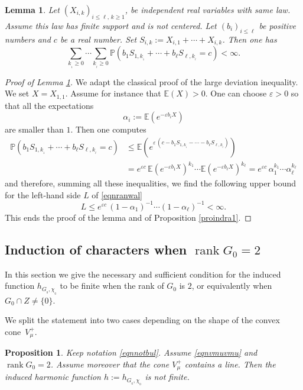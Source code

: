 \documentclass[11pt]{article}
\numberwithin{equation}{section}
\DeclareMathOperator{\rank}{rank}
\newtheorem{Prop}[Thm]{Proposition}
\newtheorem{Lem}[Thm]{Lemma}
\theoremstyle{definition}
\newcommand{\m}[1]{\mathbb{ #1}}
\let\al\alpha
\let\eps\varepsilon
\let\bq\relax
\let\eq\relax
\begin{document}
\begin{Lem}
\label{lemranwal}
Let $(X_{i,k})_{i\leq \ell,\, k\geq 1}$, be independent real variables
with same law. Assume this law has finite support and is not centered.
Let $(b_i)_{i\leq\ell}$ be positive numbers and $c$ be a real number.
Set $S_{i,k}:=X_{i,1}+\cdots+X_{i,k}$.
Then one has
\begin{equation}
\label{eqnranwal}
\sum_{k_{_1}\geq 0}\cdots\sum_{k_{_\ell}\geq 0}
\m P(b_1S_{1,k_{_1}}+\cdots +b_\ell S_{\ell,k_{_\ell}}=c)
<\infty.
\end{equation}
\end{Lem}

\begin{proof}[Proof of Lemma \ref{lemranwal}]
We adapt the classical proof of the large deviation inequality.
We set $X=X_{1,1}$. Assume for instance that $\m E (X)>0$.
One can choose $\eps>0$ so that all the expectations
\[
\al_i:=\m E(e^{-\eps b_i X})
\]
are smaller than $1$. Then one computes
\begin{align*}
\m P(b_1S_{1,k_{_1}}+\cdots +b_\ell S_{\ell,k_{_\ell}}=c)
&\leq
\m E(e^{\eps\,(c -b_1S_{1,k_{_1}}-\cdots -b_\ell S_{\ell,k_{_\ell}})})\\
&=
e^{\eps c}\,\m E(e^{-\eps b_1X})^{k_1}\cdots \m E(e^{-\eps b_\ell X})^{k_\ell}=
e^{\eps c}\,\al_1^{k_1}\cdots \al_\ell^{k_\ell}
\end{align*}
and therefore, summing all these inequalities, we find the following upper bound
for the left-hand side $L$ of \eqref{eqnranwal}
\[
L\leq e^{\eps c}\,(1-\al_1)^{-1}\cdots (1-\al_\ell)^{-1} <\infty.
\]
This ends the proof of the lemma and of Proposition \ref{proindra1}.
\end{proof}

\subsection{Induction of characters when $\rank G_0=2$}
\label{secindhar2}
\bq
In this section we give the necessary and sufficient condition for
the induced function $h_{G_{_0},\chi_{_0}}$ to be finite when
the rank of $G_0$ is $2$,
or equivalently when $G_0\cap Z\neq\{0\}$.
\eq

We split the statement into two cases depending
on the shape of the convex cone~$V^+_\mu$.

\begin{Prop}
\label{proindra2}
Keep notation \eqref{eqnnotbul}. Assume \eqref{eqnvmuvmu} and $\rank G_0=2$.
Assume moreover that the cone $V^+_\mu$ contains a line. Then
the induced harmonic function $h:=h_{G_{_0},\chi_{_0}}$ is not finite.
\end{Prop}
\end{document}
